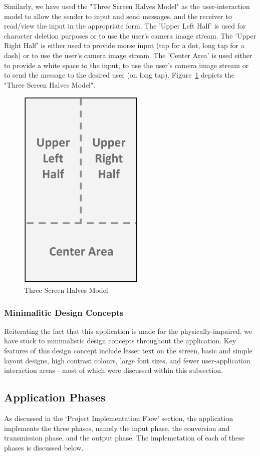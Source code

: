 \documentclass[14pt]{report}
\begin{document}
					Similarly, we have used the "Three Screen Halves Model" as the user-interaction model to allow the sender to input and send messages, and the receiver to read/view the input in the appropriate form. The 'Upper Left Half' is used for character deletion purposes or to use the user's camera image stream. The 'Upper Right Half' is either used to provide morse input (tap for a dot, long tap for a dash) or to use the user's camera image stream. The 'Center Area' is used either to provide a white space to the input, to use the user's camera image stream or to send the message to the desired user (on long tap). Figure~\ref{fig:3half} depicts the "Three Screen Halves Model".
					\begin{figure}[h]
						\includegraphics[width=6cm]{3half.png}
						\centering
						\caption{Three Screen Halves Model}
						\label{fig:3half}
					\end{figure} 

				\subsubsection{Minimalitic Design Concepts}
					Reiterating the fact that this application is made for the physically-impaired, we have stuck to minimalistic design concepts throughout the application. Key features of this design concept include lesser text on the screen, basic and simple layout designs, high contrast colours, large font sizes, and fewer user-application interaction areas - most of which were discussed within this subsection.

					

			\subsection{Application Phases}
					As discussed in the `Project Implementation Flow' section, the application implements the three phases, namely the input phase, the conversion and transmission phase, and the output phase. The implemetation of each of these phases is discussed below.
\end{document}

